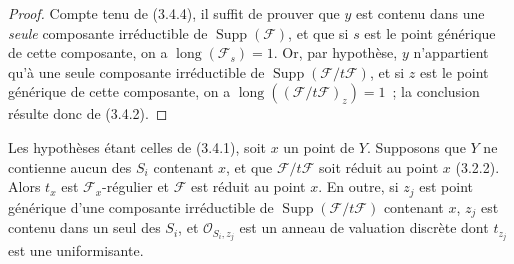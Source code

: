 \begin{proof}
Compte tenu de (3.4.4), il suffit de prouver que $y$ est contenu dans une
\emph{seule} composante irréductible de $\operatorname{Supp}(\mathcal F)$, et
que si $s$ est le point générique de cette composante, on a
$\operatorname{long}(\mathcal F_s)=1$. Or, par hypothèse, $y$ n'appartient
qu'à une seule composante irréductible de
$\operatorname{Supp}(\mathcal F/t\mathcal F)$, et si $z$ est le point
générique de cette composante, on a
$\operatorname{long}((\mathcal F/t\mathcal F)_z)=1$~; la conclusion résulte
donc de (3.4.2).
\end{proof}

\begin{proposition}[3.4.6]
\label{IV.2.3.4.6-fr}
Les hypothèses étant celles de (3.4.1), soit $x$ un point de $Y$. Supposons
que $Y$ ne contienne aucun des $S_i$ contenant $x$, et que
$\mathcal F/t\mathcal F$ soit réduit au point $x$ (3.2.2). Alors $t_x$ est
$\mathcal F_x$-régulier et $\mathcal F$ est réduit au point $x$. En outre, si
$z_j$ est point générique d'une composante irréductible de
$\operatorname{Supp}(\mathcal F/t\mathcal F)$ contenant $x$, $z_j$ est
contenu dans un seul des $S_i$, et $\mathcal O_{S_i,z_j}$ est un anneau de
valuation discrète dont $t_{z_j}$ est une uniformisante.
\end{proposition}

